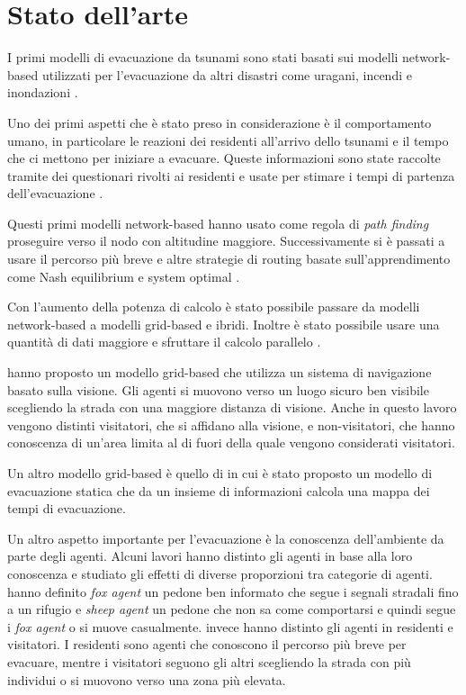 \section{Stato dell'arte}
\label{sec:stato-arte}
I primi modelli di evacuazione da tsunami sono stati basati sui modelli network-based utilizzati per l'evacuazione da altri disastri come
uragani, incendi e inondazioni \parencite{usuzawa1997development, imamura2001development}.

Uno dei primi aspetti che è stato preso in considerazione è il comportamento umano,
in particolare le reazioni dei residenti all'arrivo dello tsunami
e il tempo che ci mettono per iniziare a evacuare.
%
Queste informazioni sono state raccolte tramite dei questionari rivolti ai residenti
e usate per stimare i tempi di partenza dell'evacuazione \parencite{imamura2001development, saito2004simulation}.

Questi primi modelli network-based hanno usato come regola di \textit{path finding}
proseguire verso il nodo con altitudine maggiore.
Successivamente si è passati a usare il percorso
più breve \parencite{katada2004disaster} e altre strategie di routing basate sull'apprendimento 
come Nash equilibrium e system optimal \parencite{lammel2009towards}.


Con l'aumento della potenza di calcolo è stato possibile passare da modelli network-based a modelli grid-based e ibridi.
Inoltre è stato possibile usare una quantità di dati maggiore e sfruttare il calcolo parallelo \parencite{wijerathne2013hpc, makinoshima2018enhancing}.

\textcite{wijerathne2013hpc} hanno proposto un modello grid-based che utilizza un sistema di navigazione basato
sulla visione. Gli agenti si muovono verso un luogo sicuro ben visibile scegliendo la strada con una maggiore distanza di visione.
%
Anche in questo lavoro vengono distinti visitatori, che si affidano alla visione, e non-visitatori, che hanno conoscenza di un'area
limita al di fuori della quale vengono considerati visitatori.

Un altro modello grid-based è quello di \textcite{mas2012agent} 
in cui è stato proposto un modello di evacuazione statica che da un insieme di informazioni %
calcola una mappa dei tempi di evacuazione.


Un altro aspetto importante per l'evacuazione è la conoscenza dell'ambiente da parte degli agenti.
Alcuni lavori hanno distinto gli agenti in base alla loro conoscenza e
studiato gli effetti di diverse proporzioni tra categorie di agenti.
\textcite{nguyen2012simulation} hanno definito \textit{fox agent} un pedone ben informato che segue i segnali
stradali fino a un rifugio e \textit{sheep agent} un pedone che non sa
come comportarsi e quindi segue i \textit{fox agent} o si muove casualmente.
\textcite{takabatake2017simulated} invece hanno distinto gli agenti in residenti e visitatori.
I residenti sono agenti che conoscono il percorso più breve per evacuare, mentre i visitatori
seguono gli altri scegliendo la strada con più individui o si muovono verso una zona più elevata.


